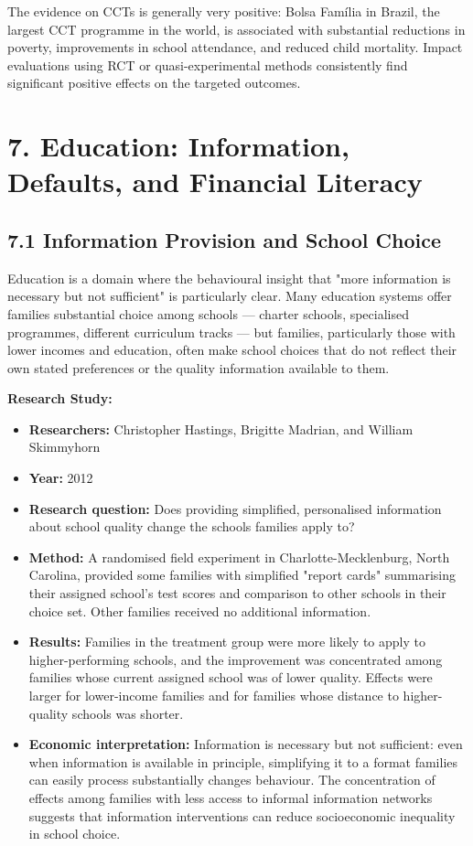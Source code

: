 \documentclass[12pt, letterpaper]{article}
\begin{document}
The evidence on CCTs is generally very positive: Bolsa Família in Brazil, the largest CCT programme in the world, is associated with substantial reductions in poverty, improvements in school attendance, and reduced child mortality. Impact evaluations using RCT or quasi-experimental methods consistently find significant positive effects on the targeted outcomes.

\medskip


\section{7. Education: Information, Defaults, and Financial Literacy}



\subsection{7.1 Information Provision and School Choice}


Education is a domain where the behavioural insight that "more information is necessary but not sufficient" is particularly clear. Many education systems offer families substantial choice among schools --- charter schools, specialised programmes, different curriculum tracks --- but families, particularly those with lower incomes and education, often make school choices that do not reflect their own stated preferences or the quality information available to them.

\textbf{Research Study:}
\begin{itemize}
\item \textbf{Researchers:} Christopher Hastings, Brigitte Madrian, and William Skimmyhorn
\item \textbf{Year:} 2012
\item \textbf{Research question:} Does providing simplified, personalised information about school quality change the schools families apply to?
\item \textbf{Method:} A randomised field experiment in Charlotte-Mecklenburg, North Carolina, provided some families with simplified "report cards" summarising their assigned school's test scores and comparison to other schools in their choice set. Other families received no additional information.
\item \textbf{Results:} Families in the treatment group were more likely to apply to higher-performing schools, and the improvement was concentrated among families whose current assigned school was of lower quality. Effects were larger for lower-income families and for families whose distance to higher-quality schools was shorter.
\item \textbf{Economic interpretation:} Information is necessary but not sufficient: even when information is available in principle, simplifying it to a format families can easily process substantially changes behaviour. The concentration of effects among families with less access to informal information networks suggests that information interventions can reduce socioeconomic inequality in school choice.
\end{itemize}
\end{document}
